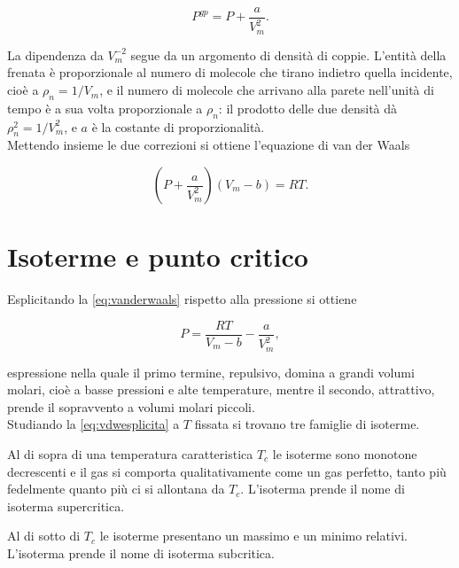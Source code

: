 \begin{equation}
    P^{gp} = P + \frac{a}{V_m^2}.
    \label{eq:correzionepressione}
\end{equation}

La dipendenza da $V_m^{-2}$ segue da un argomento di densità di coppie.
L'entità della frenata è proporzionale al numero di molecole che tirano indietro quella incidente, cioè a $\rho_n = 1/V_m$, e il numero di molecole che arrivano alla parete nell'unità di tempo è a sua volta proporzionale a $\rho_n$: il prodotto delle due densità dà $\rho_n^2 = 1/V_m^2$, e $a$ è la costante di proporzionalità.\\

Mettendo insieme le due correzioni si ottiene l'equazione di van der Waals

\begin{equation}
    \left(P + \frac{a}{V_m^2}\right)(V_m - b) = RT .
    \label{eq:vanderwaals}
\end{equation}

\section{Isoterme e punto critico}

Esplicitando la \eqref{eq:vanderwaals} rispetto alla pressione si ottiene

\begin{equation}
    P = \frac{RT}{V_m - b} - \frac{a}{V_m^2},
    \label{eq:vdwesplicita}
\end{equation}

espressione nella quale il primo termine, repulsivo, domina a grandi volumi molari, cioè a basse pressioni e alte temperature, mentre il secondo, attrattivo, prende il sopravvento a volumi molari piccoli.\\

Studiando la \eqref{eq:vdwesplicita} a $T$ fissata si trovano tre famiglie di isoterme.

Al di sopra di una temperatura caratteristica $T_c$ le isoterme sono monotone decrescenti e il gas si comporta qualitativamente come un gas perfetto, tanto più fedelmente quanto più ci si allontana da $T_c$. L'isoterma prende il nome di isoterma supercritica.

Al di sotto di $T_c$ le isoterme presentano un massimo e un minimo relativi. L'isoterma prende il nome di isoterma subcritica.

